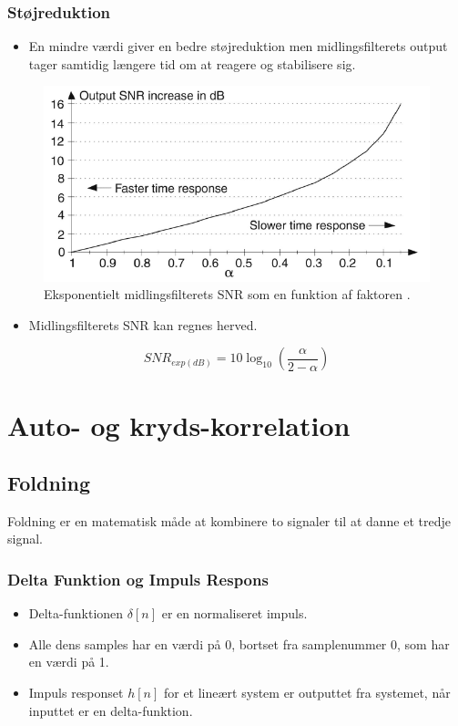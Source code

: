 \documentclass[danish]{article}
\begin{document}
\subsubsection{Støjreduktion}
\begin{itemize}
	\item En mindre \si{\alpha} værdi giver en bedre støjreduktion men midlingsfilterets output tager samtidig længere tid om at reagere og stabilisere sig. 
\end{itemize}

\begin{figure} [H]
	\centering
	\includegraphics[width=0.6\linewidth]{graphics/exp_snr}
	\caption{Eksponentielt midlingsfilterets SNR som en funktion af faktoren \si{\alpha}.}
	\label{fig:exp_snr}
\end{figure}

\begin{itemize}
	\item Midlingsfilterets SNR kan regnes herved.
\end{itemize}

\begin{equation}
SNR_{exp(dB)} = 10 \log_{10}\left(\dfrac{\si{\alpha}}{2-\si{\alpha}}\right)
\end{equation}

\newpage
\section{Auto- og kryds-korrelation}
\subsection{Foldning}
Foldning er en matematisk måde at kombinere to signaler til at danne et tredje signal.
\subsubsection{Delta Funktion og Impuls Respons}
\begin{itemize}
	\item Delta-funktionen $\delta[n]$ er en normaliseret impuls.
	\item Alle dens samples har en værdi på 0, bortset fra samplenummer 0, som har en værdi på 1.
	\item Impuls responset $h[n]$ for et lineært system er outputtet fra systemet, når inputtet er en delta-funktion.
\end{itemize}
\end{document}
